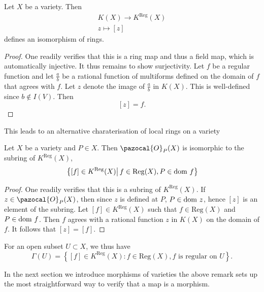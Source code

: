     \begin{lemma}
        Let $X$ be a variety. Then 
        \begin{gather*}
            K(X)\rightarrow K^\mathrm{Reg}(X)\\
            z \mapsto [z]
        \end{gather*}
        defines an isomorphism of rings. 
    \end{lemma}
    \begin{proof}
        One readily verifies that this is a ring map and thus a field map, which is automatically injective. It thus remains to show surjectivity. Let $f$ be a regular function and let $\frac{a}{b}$ be a rational function of multiforms defined on the domain of $f$ that agrees with $f$. Let $z$ denote the image of $\frac{a}{b}$ in $K(X)$. This is well-defined since $b\notin  I(V)$. Then 
        $$
            \left[z\right] = f.
        $$  
    \end{proof}
    This leads to an alternative charaterisation of local rings on a variety
    \begin{lemma}
        Let $X$ be a variety and $P\in X$. Then $\pazocal{O}_P(X)$ is isomorphic to the subring of $K^\mathrm{Reg}(X)$,
        $$
            \left.\left\{ [f]\in K^\mathrm{Reg}(X) \right| f\in \mathrm{Reg}(X), P\in \mathrm{dom} \ f  \right\} 
        $$
    \end{lemma}
    \begin{proof}
        One readily verifies that this is a subring of $K^\mathrm{Reg}(X)$. If $z\in \pazocal{O}_P(X)$, then since $z$ is defined at $P$, $P\in \mathrm{dom} \ z$, hence $[z]$ is an element of the subring. Let $[f]\in K^\mathrm{Reg}(X)$ such that $f\in \mathrm{Reg}(X)$ and $P\in \mathrm{dom} \ f$. Then $f$ agrees with a rational function $z$ in $K(X)$ on the domain of $f$. It follows that $[z]=[f]$.  
    \end{proof}
    \begin{remark}
        For an open subset $U\subset X$, we thus have 
        $$
            \Gamma(U) = \left\{[f]\in K^\mathrm{Reg}(X) : f\in \mathrm{Reg}(X), f \text{ is regular on } U\right\}.
        $$
    \end{remark}
    In the next section we introduce morphisms of varieties the above remark sets up the most straightforward way to verify that a map is a morphism.
